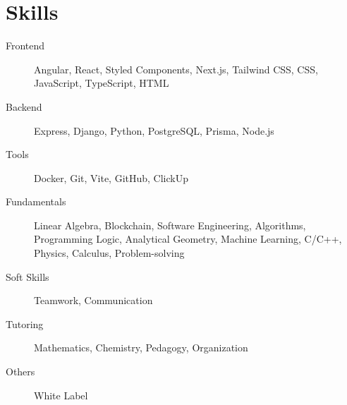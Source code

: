 \documentclass[11pt]{article}
\begin{document}
\section{Skills}
\begin{description}
    
    \item[Frontend] Angular, React, Styled Components, Next.js, Tailwind CSS, CSS, JavaScript, TypeScript, HTML
    
    \item[Backend] Express, Django, Python, PostgreSQL, Prisma, Node.js
    
    \item[Tools] Docker, Git, Vite, GitHub, ClickUp
    
    \item[Fundamentals] Linear Algebra, Blockchain, Software Engineering, Algorithms, Programming Logic, Analytical Geometry, Machine Learning, C/C++, Physics, Calculus, Problem-solving
    
    \item[Soft Skills] Teamwork, Communication
    
    \item[Tutoring] Mathematics, Chemistry, Pedagogy, Organization
    
    \item[Others] White Label
    
\end{description}
\end{document}
